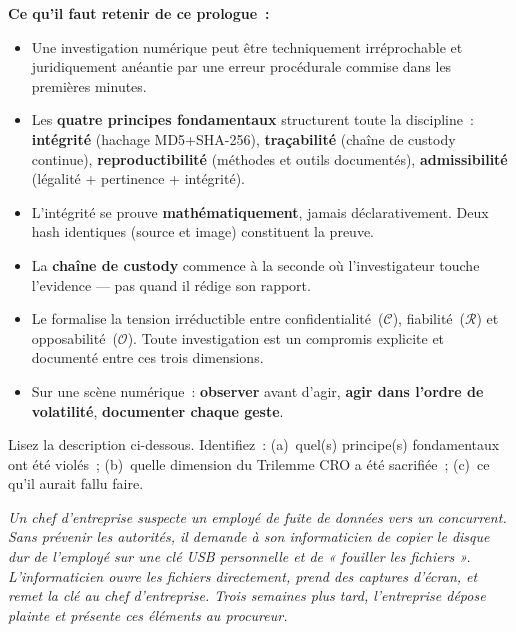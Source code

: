 \begin{boxresume}
\textbf{Ce qu'il faut retenir de ce prologue~:}

\begin{itemize}
    \item Une investigation numérique peut être techniquement irréprochable
          et juridiquement anéantie par une erreur procédurale commise dans
          les premières minutes.

    \item Les \textbf{quatre principes fondamentaux} structurent toute la
          discipline~: \textbf{intégrité} (hachage MD5+SHA-256),
          \textbf{traçabilité} (chaîne de custody continue),
          \textbf{reproductibilité} (méthodes et outils documentés),
          \textbf{admissibilité} (légalité + pertinence + intégrité).

    \item L'intégrité se prouve \textbf{mathématiquement}, jamais
          déclarativement. Deux hash identiques (source et image) constituent
          la preuve.

    \item La \textbf{chaîne de custody} commence à la seconde où
          l'investigateur touche l'evidence --- pas quand il rédige son rapport.

    \item Le  formalise la tension irréductible entre
          confidentialité~($\mathcal{C}$), fiabilité~($\mathcal{R}$)
          et opposabilité~($\mathcal{O}$). Toute investigation est un
          compromis explicite et documenté entre ces trois dimensions.

    \item Sur une scène numérique~: \textbf{observer} avant d'agir,
          \textbf{agir dans l'ordre de volatilité}, \textbf{documenter
          chaque geste}.
\end{itemize}
\end{boxresume}

\bigskip

\begin{boxexo}[title={\ding{45}\quad Exercice P.1 --- Diagnostic d'une violation \niveaubase}]
Lisez la description ci-dessous. Identifiez~: (a)~quel(s) principe(s)
fondamentaux ont été violés~; (b)~quelle dimension du Trilemme CRO a été
sacrifiée~; (c)~ce qu'il aurait fallu faire.

\medskip
\textit{Un chef d'entreprise suspecte un employé de fuite de données
vers un concurrent. Sans prévenir les autorités, il demande à son
informaticien de copier le disque dur de l'employé sur une clé USB
personnelle et de « fouiller les fichiers ». L'informaticien ouvre
les fichiers directement, prend des captures d'écran, et remet la
clé au chef d'entreprise. Trois semaines plus tard, l'entreprise
dépose plainte et présente ces éléments au procureur.}
\end{boxexo}

